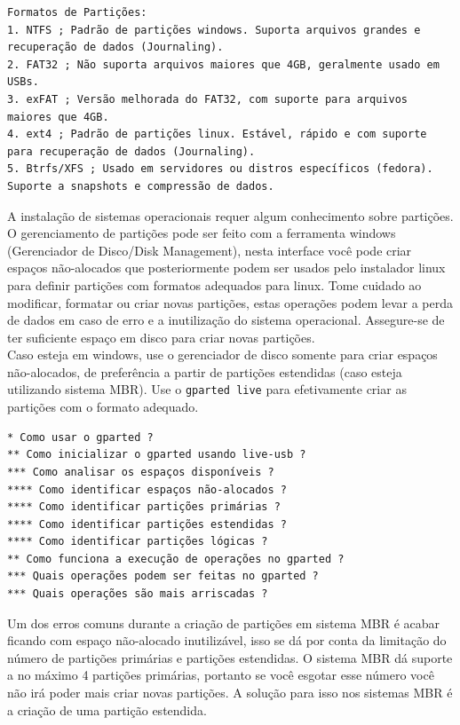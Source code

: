 \documentclass[12pt,a4paper]{article}
\begin{document}
\begin{lstlisting}
Formatos de Partições:
1. NTFS ; Padrão de partições windows. Suporta arquivos grandes e recuperação de dados (Journaling).
2. FAT32 ; Não suporta arquivos maiores que 4GB, geralmente usado em USBs.
3. exFAT ; Versão melhorada do FAT32, com suporte para arquivos maiores que 4GB.
4. ext4 ; Padrão de partições linux. Estável, rápido e com suporte para recuperação de dados (Journaling).
5. Btrfs/XFS ; Usado em servidores ou distros específicos (fedora). Suporte a snapshots e compressão de dados.
\end{lstlisting}

\vspace{\baselineskip}

A instalação de sistemas operacionais requer algum conhecimento sobre partições. O gerenciamento de partições pode ser feito com a ferramenta windows (Gerenciador de Disco/Disk Management), nesta interface você pode criar espaços não-alocados que posteriormente podem ser usados pelo instalador linux para definir partições com formatos adequados para linux. Tome cuidado ao modificar, formatar ou criar novas partições, estas operações podem levar a perda de dados em caso de erro e a inutilização do sistema operacional. Assegure-se de ter suficiente espaço em disco para criar novas partições.\\

Caso esteja em windows, use o gerenciador de disco somente para criar espaços não-alocados, de preferência a partir de partições estendidas (caso esteja utilizando sistema MBR). Use o \texttt{gparted live} para efetivamente criar as partições com o formato adequado. \\

\begin{lstlisting}
* Como usar o gparted ?
** Como inicializar o gparted usando live-usb ?
*** Como analisar os espaços disponíveis ?
**** Como identificar espaços não-alocados ?
**** Como identificar partições primárias ?
**** Como identificar partições estendidas ?
**** Como identificar partições lógicas ? 
** Como funciona a execução de operações no gparted ? 
*** Quais operações podem ser feitas no gparted ?
*** Quais operações são mais arriscadas ?
\end{lstlisting}

\vspace{\baselineskip}

Um dos erros comuns durante a criação de partições em sistema MBR é acabar ficando com espaço não-alocado inutilizável, isso se dá por conta da limitação do número de partições primárias e partições estendidas. O sistema MBR dá suporte a no máximo 4 partições primárias, portanto se você esgotar esse número você não irá poder mais criar novas partições. A solução para isso nos sistemas MBR é a criação de uma partição estendida. \\ 
\end{document}
